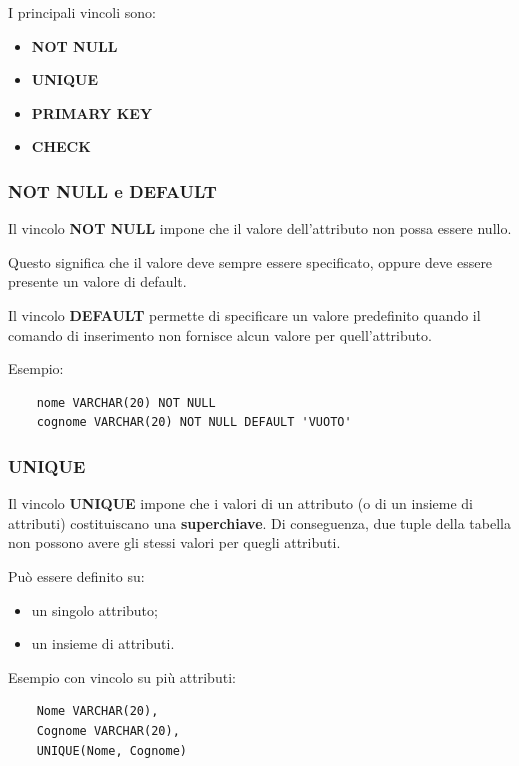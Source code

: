 I principali vincoli sono:

\begin{itemize}
	\item \textbf{NOT NULL}
	\item \textbf{UNIQUE}
	\item \textbf{PRIMARY KEY}
	\item \textbf{CHECK}
\end{itemize}

\subsubsection*{NOT NULL e DEFAULT}

Il vincolo \textbf{NOT NULL} impone che il valore dell’attributo non possa essere nullo.

Questo significa che il valore deve sempre essere specificato, oppure deve essere
presente un valore di default.

Il vincolo \textbf{DEFAULT} permette di specificare un valore predefinito quando
il comando di inserimento non fornisce alcun valore per quell’attributo.

Esempio:

\begin{verbatim}
	nome VARCHAR(20) NOT NULL
	cognome VARCHAR(20) NOT NULL DEFAULT 'VUOTO'
\end{verbatim}

\subsubsection*{UNIQUE}

Il vincolo \textbf{UNIQUE} impone che i valori di un attributo (o di un insieme di
attributi) costituiscano una \textbf{superchiave}.  
Di conseguenza, due tuple della tabella non possono avere gli stessi valori
per quegli attributi.

Può essere definito su:

\begin{itemize}
	\item un singolo attributo;
	\item un insieme di attributi.
\end{itemize}

Esempio con vincolo su più attributi:

\begin{verbatim}
	Nome VARCHAR(20),
	Cognome VARCHAR(20),
	UNIQUE(Nome, Cognome)
\end{verbatim}

